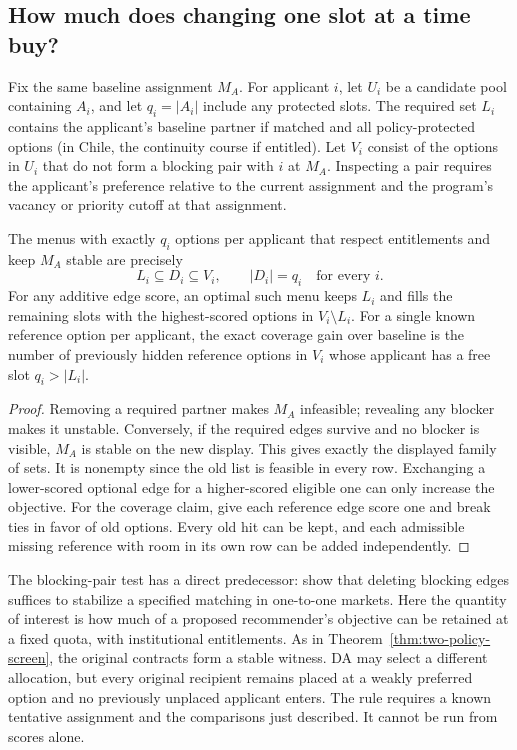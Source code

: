 \subsection{How much does changing one slot at a time buy?}\label{sec:slots}
Fix the same baseline assignment $M_A$. For applicant $i$, let $U_i$ be a candidate pool containing $A_i$, and let $q_i=|A_i|$ include any protected slots. The required set $L_i$ contains the applicant's baseline partner if matched and all policy-protected options (in Chile, the continuity course if entitled). Let $V_i$ consist of the options in $U_i$ that do not form a blocking pair with $i$ at $M_A$. Inspecting a pair requires the applicant's preference relative to the current assignment and the program's vacancy or priority cutoff at that assignment.

\begin{proposition}\label{prop:slots}
The menus with exactly $q_i$ options per applicant that respect entitlements and keep $M_A$ stable are precisely
\[
 L_i\subseteq D_i\subseteq V_i,\qquad |D_i|=q_i\quad\text{for every }i.
\]
For any additive edge score, an optimal such menu keeps $L_i$ and fills the remaining slots with the highest-scored options in $V_i\setminus L_i$. For a single known reference option per applicant, the exact coverage gain over baseline is the number of previously hidden reference options in $V_i$ whose applicant has a free slot $q_i>|L_i|$.
\end{proposition}
\begin{proof}
Removing a required partner makes $M_A$ infeasible; revealing any blocker makes it unstable. Conversely, if the required edges survive and no blocker is visible, $M_A$ is stable on the new display. This gives exactly the displayed family of sets. It is nonempty since the old list is feasible in every row. Exchanging a lower-scored optional edge for a higher-scored eligible one can only increase the objective. For the coverage claim, give each reference edge score one and break ties in favor of old options. Every old hit can be kept, and each admissible missing reference with room in its own row can be added independently.
\end{proof}
The blocking-pair test has a direct predecessor: \citet[Observation~1]{boehmer2021} show that deleting blocking edges suffices to stabilize a specified matching in one-to-one markets. Here the quantity of interest is how much of a proposed recommender's objective can be retained at a fixed quota, with institutional entitlements. As in Theorem~\ref{thm:two-policy-screen}, the original contracts form a stable witness. DA may select a different allocation, but every original recipient remains placed at a weakly preferred option and no previously unplaced applicant enters. The rule requires a known tentative assignment and the comparisons just described. It cannot be run from scores alone.

